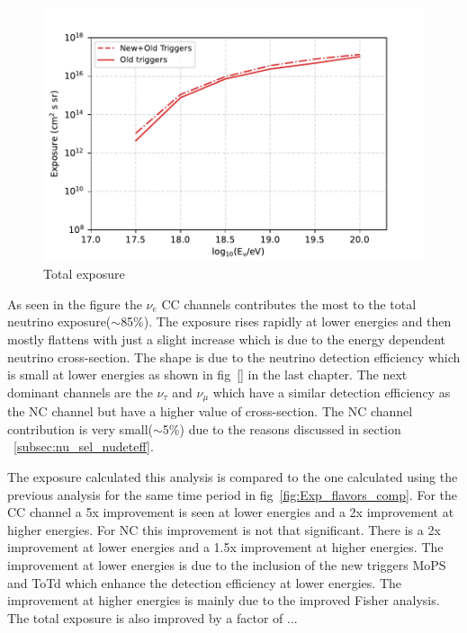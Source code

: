 \begin{figure}[t!]
  \centering
  \includegraphics[width=14.5cm]{thesis_figures/ExpLimits/Exposure_comp_total_new_sim_optim.pdf}
  \caption{Total exposure}
  \label{fig:Exp_total_comp}
\end{figure}

As seen in the figure the $\nu_e$ CC channels contributes the most to the total neutrino exposure($\sim$85\%). The exposure rises rapidly at lower energies and then mostly flattens with just a slight increase which is due to the energy dependent neutrino cross-section. The shape is due to the neutrino detection efficiency which is small at lower energies as shown in fig~\ref{} in the last chapter. The next dominant channels are the $\nu_{\tau}$ and $\nu_{\mu}$ which have a similar detection efficiency as the NC channel but have a higher value of cross-section. The NC channel contribution is very small($\sim$5\%) due to the reasons discussed in section ~\ref{subsec:nu_sel_nudeteff}.  

The exposure calculated this analysis is compared to the one calculated using the previous analysis for the same time period in fig~\ref{fig:Exp_flavors_comp}. For the CC channel a 5x improvement is seen at lower energies and a 2x improvement at higher energies. For NC this improvement is not that significant. There is a 2x improvement at lower energies and a 1.5x improvement at higher energies. The improvement at lower energies is due to the inclusion of the new triggers MoPS and ToTd which enhance the detection efficiency at lower energies. The improvement at higher energies is mainly due to the improved Fisher analysis. The total exposure is also improved by a factor of ... 

